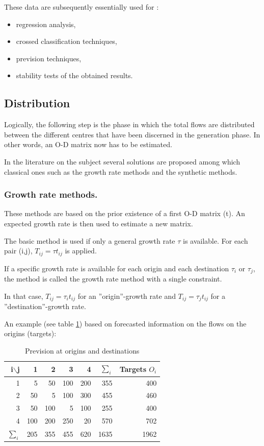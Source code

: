 These data are subsequently essentially used for :
\begin{itemize}
\item regression analysis,
\item crossed classification techniques,
\item prevision techniques,
\item stability tests of the obtained results.
\end{itemize}


\subsection{Distribution}

Logically, the following step is the phase in which the total flows are
distributed between the different centres that have been discerned in the
generation phase.  In other words, an O-D matrix now has to be estimated.

In the literature on the subject several solutions are proposed among which
classical ones such as the growth rate methods and the synthetic methods.


\subsubsection{Growth rate methods.}

These methods are based on the prior existence of a first O-D matrix (t).
An expected growth rate is then used to estimate a new matrix.

The basic method is used if only a general growth rate $\tau$ is available. For
each pair (i,j), $T_{ij}= \tau t_{ij}$ is applied.

If a specific growth rate is available for each origin and each destination
$\tau_i$ or $\tau_j$, the method is called the growth rate method with a single
constraint.

In that case, $T_{ij} = \tau_it_{ij}$ for an ''origin''-growth rate and $T_{ij}
= \tau _jt_{ij}$ for a ''destination''-growth rate.

An example (see table \ref{tab2_1}) based on forecasted information on the
flows on the origins (targets):


\begin{table}[htbp]
\begin{center}
\begin{tabular}{rrrrrrr}
\hline
i$\backslash$j & 1 & 2 & 3 & 4 & $\sum\limits_{i}$ & Targets $O_i$\\
\hline
1 & 5 & 50 & 100 & 200 & 355 & 400\\ 2 & 50 & 5 & 100 & 300 & 455 & 460\\

3 & 50 & 100 & 5 & 100 & 255 & 400\\ 4 & 100 & 200 & 250 & 20 & 570 & 702\\
$\sum\limits_{i}$ & 205 & 355 & 455 & 620 & 1635 & 1962\\
\hline
\end{tabular}
\caption{\label{tab2_1} Prevision at origins and destinations}
\end{center}
\end{table}

